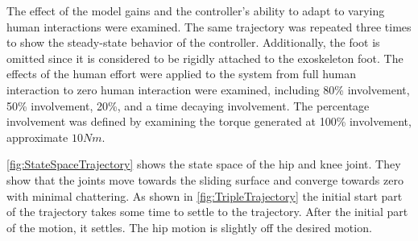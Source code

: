 The effect of the model gains and the controller's ability to adapt to varying human interactions were examined. The same trajectory was repeated three times to show the steady-state behavior of the controller. Additionally, the foot is omitted since it is considered to be rigidly attached to the exoskeleton foot. 
The effects of the human effort were applied to the system from full human interaction to zero human interaction were examined, including 80\% involvement, 50\% involvement, 20\%, and a time decaying involvement. The percentage involvement was defined by examining the torque generated at 100\% involvement, approximate $10Nm$. 

\autoref{fig:StateSpaceTrajectory} shows the state space of the hip and knee joint. They show that the joints move towards the sliding surface and converge towards zero with minimal chattering. As shown in \autoref{fig:TripleTrajectory} the initial start part of the trajectory takes some time to settle to the trajectory. After the initial part of the motion, it settles. The hip motion is slightly off the desired motion. 



